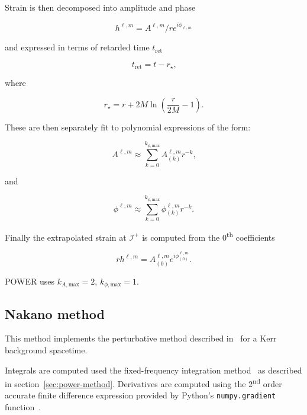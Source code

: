 Strain is then decomposed into amplitude and phase

\begin{equation}
h^{\ell,m} = A^{\ell,m}/r e^{i \phi_{\ell,m}}
\label{eqn:ampphase}
\end{equation}

and expressed in terms of retarded time $t_{\textrm{ret}}$

\begin{equation}
t_{\textrm{ret}} = t - r_{\star}\textrm{,}
\label{eqn:tret}
\end{equation}

where

\begin{equation}
r_{\star} = r + 2 M \ln \left( \frac{r}{2 M} - 1 \right)\textrm{.}
\label{eqn:rstar}
\end{equation}

These are then separately fit to polynomial expressions of the form:

\begin{equation}
A^{\ell,m} \approx \sum_{k=0}^{k_{\phi,\textrm{max}}} A_{(k)}^{\ell,m} r^{-k}\textrm{,}
\label{eqn:Afit}
\end{equation}

and

\begin{equation}
\phi^{\ell,m} \approx \sum_{k=0}^{k_{\phi,\textrm{max}}} \phi_{(k)}^{\ell,m} r^{-k}\textrm{.}
\label{eqn:phifit}
\end{equation}

Finally the extrapolated strain at $\mathcal{I}^+$ is computed from the
$0$\textsuperscript{th} coefficients

\begin{equation}
r h^{\ell,m} = A_{(0)}^{\ell,m} e^{i \phi_{(0)}^{\ell,m}}\textrm{.}
\label{eqn:exptrapolated-strain}
\end{equation}

POWER uses $k_{A,\textrm{max}} = 2$, $k_{\phi,\textrm{max}} = 1$.

\subsection{Nakano method}

This method implements the perturbative method described
in~\cite{POWER-Nakano:2015pta} for a Kerr background spacetime.

Integrals are computed used the fixed-frequency integration
method~\cite{POWER-Reisswig:2010di} as described in
section~\ref{sec:power-method}. Derivatives are computed using the
2\textsuperscript{nd} order accurate finite difference expression provided by
Python's \texttt{numpy.gradient} function~\cite{POWER-Harris:2020xlr}.

